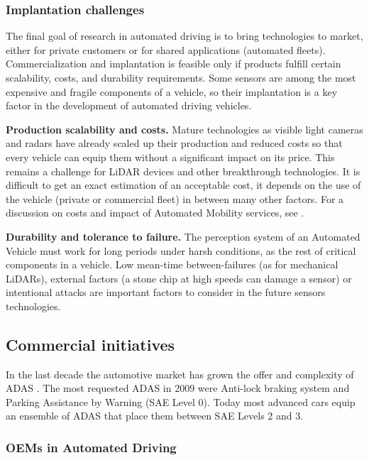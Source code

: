 \documentclass[journal]{IEEEtran}
\begin{document}
\subsubsection{Implantation challenges}

The final goal of research in automated driving is to bring technologies to
market, either for private customers or for shared applications (automated 
fleets). Commercialization and implantation is feasible only if products 
fulfill certain scalability, costs, and durability requirements.
Some sensors are among the most expensive and fragile components of a vehicle,
so their implantation is a key factor in the development of automated driving
vehicles.

\textbf{Production scalability and costs.} 
Mature technologies as visible light cameras and radars have already scaled up 
their production and reduced costs so that every vehicle can equip them without
a significant impact on its price. This remains a challenge for LiDAR devices
and other breakthrough technologies.
It is difficult to get an exact estimation of an acceptable cost, 
it depends on the use of the vehicle (private or commercial fleet)
in between many other factors. 
For a discussion on costs and impact of Automated Mobility services, see
\cite{Bosch2018}.

\textbf{Durability and tolerance to failure.}
The perception system of an Automated Vehicle must work for long
periods under harsh conditions, as the rest of critical components in a vehicle.
Low mean-time between-failures (as for mechanical LiDARs), external factors 
(a stone chip at high speeds can damage a sensor) or intentional attacks \cite{Petit2015a}
are important factors to consider in the future sensors technologies.


\subsection{Commercial initiatives}

In the last decade the automotive market has grown the offer and complexity
of ADAS \cite{Perez2016}. The most requested ADAS in 2009
\cite{Frost&Sullivan2010} were Anti-lock braking system and Parking Assistance
by Warning (SAE Level 0). Today most advanced cars equip an ensemble of
ADAS that place them between SAE Levels 2 and 3. 

\subsubsection{OEMs in Automated Driving}
\label{sec:oem-ad}
\end{document}
